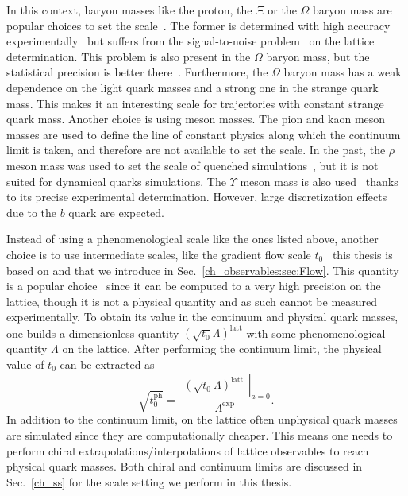 In this context, baryon masses like the proton, the $\Xi$ or the $\Omega$ baryon mass are popular choices to set the scale~\citep{BMW:2012hcm,Miller:2020evg,RQCD_scale}. The former is determined with high accuracy experimentally~\citep{ParticleDataGroup:2020ssz} but suffers from the signal-to-noise problem~\citep{Lepage:1989hd,Luscher:2010ae} on the lattice determination. This problem is also present in the $\Omega$ baryon mass, but the statistical precision is better there~\citep{BMW:2012hcm,Miller:2020evg}. Furthermore, the $\Omega$ baryon mass has a weak dependence on the light quark masses and a strong one in the strange quark mass. This makes it an interesting scale for trajectories with constant strange quark mass. Another choice is using meson masses. The pion and kaon meson masses are used to define the line of constant physics along which the continuum limit is taken, and therefore are not available to set the scale. In the past, the $\rho$ meson mass was used to set the scale of quenched simulations~\citep{Mawhinney:1996jk,Irving:1998yu,Bornyakov:2015plz}, but it is not suited for dynamical quarks simulations. The $\Upsilon$ meson mass is also used~\citep{HPQCD:2011qw,Gray:2005ur} thanks to its precise experimental determination. However, large discretization effects due to the $b$ quark are expected. 

Instead of using a phenomenological scale like the ones listed above, another choice is to use intermediate scales, like the gradient flow scale $t_0$~\citep{Luscher:2010we,1006.4518} this thesis is based on and that we introduce in Sec.~\ref{ch_observables:sec:Flow}. This quantity is a popular choice~\citep{Bruno:2016plf,Strassberger:2023xnj,RQCD_scale,Kostrzewa:2021syw,Hollwieser:2020qri,MILC:2015tqx} since it can be computed to a very high precision on the lattice, though it is not a physical quantity and as such cannot be measured experimentally. To obtain its value in the continuum and physical quark masses, one builds a dimensionless quantity $(\sqrt{t_0}\Lambda)^{\textrm{latt}}$ with some phenomenological quantity $\Lambda$ on the lattice. After performing the continuum limit, the physical value of $t_0$ can be extracted as
\begin{equation}
\label{ch_foundation:eq:Lambda}
\sqrt{t_0^{\textrm{ph}}}=\frac{\left.\begin{matrix}
\left(\sqrt{t_0}\Lambda\right)^{\textrm{latt}}
\end{matrix}\right|_{a=0}}{\Lambda^{\textrm{exp}}}.
\end{equation}
In addition to the continuum limit, on the lattice often unphysical quark masses are simulated since they are computationally cheaper. This means one needs to perform chiral extrapolations/interpolations of lattice observables to reach physical quark masses. Both chiral and continuum limits are discussed in Sec.~\ref{ch_ss} for the scale setting we perform in this thesis.

